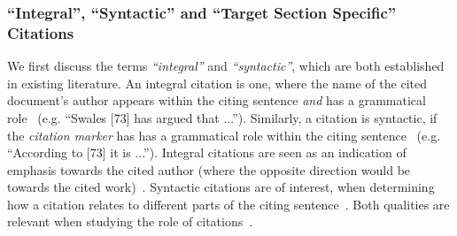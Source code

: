 \subsubsection{``Integral'', ``Syntactic'' and ``Target Section Specific'' Citations}\label{sec:termdefs}
We first discuss the terms \emph{``integral''} and \emph{``syntactic''}, which are both established in existing literature. An integral citation is one, where the name of the cited document's author appears within the citing sentence \emph{and} has a grammatical role~\cite{Swales1990,Hyland1999} (e.g. ``Swales [73] has argued that ...''). Similarly, a citation is syntactic, if the \emph{citation marker} has has a grammatical role within the citing sentence~\cite{Whidby2011,Abujbara2012} (e.g. ``According to [73] it is ...''). Integral citations are seen as an indication of emphasis towards the cited author (where the opposite direction would be towards the cited work)~\cite{Swales1990,Hyland1999}. Syntactic citations are of interest, when determining how a citation relates to different parts of the citing sentence~\cite{Whidby2011,Abujbara2012}. Both qualities are relevant when studying the role of citations~\cite{Faerber2019TPDL}.


